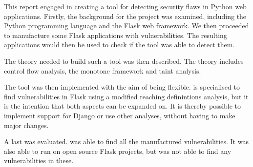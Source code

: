 This report engaged in creating a tool for detecting security flaws in Python web applications.
Firstly, the background for the project was examined, including the Python programming language and the Flask web framework.
We then proceeded to manufacture some Flask applications with vulnerabilities.
The resulting applications would then be used to check if the tool was able to detect them.

The theory needed to build such a tool was then described.
The theory includes control flow analysis, the monotone framework and taint analysis.

The tool \pyt{} was then implemented with the aim of being flexible.
\pyt{} is specialised to find vulnerabilities in Flask using a modified reaching definintions analysis, but it is the intention that both aspects can be expanded on.
It is thereby possible to implement support for Django or use other analyses, without having to make major changes.

A last \pyt{} was evaluated.
\pyt{} was able to find all the manufactured vulnerabilities.
It was also able to run on open source Flask projects, but was not able to find any vulnerabilities in these.
